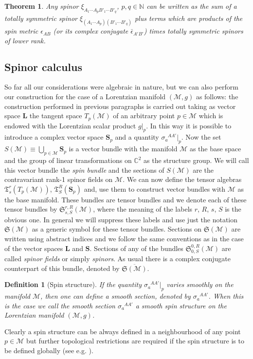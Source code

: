 \documentclass[final,3p,times,twocolumn]{elsarticle}
\newtheorem{theorem}{Theorem}
\newtheorem{definition}{Definition}
\begin{document}
\begin{theorem}
 Any spinor $\xi_{A_1\cdots A_p B'_1\cdots B'_q}$, $p,q\in\mathbb{N}$ can be written as the sum
of a totally symmetric spinor $\xi_{(A_1\cdots A_p) (B'_1\cdots B'_q)}$ plus terms which are 
products of the spin metric $\epsilon_{AB}$ (or its complex conjugate $\bar\epsilon_{A'B'}$) 
times totally symmetric spinors of lower rank.
\label{theo:irr-decomp}
\end{theorem}


\subsection{Spinor calculus}
\label{subsec:spinor-calculus}
So far all our considerations were algebraic in nature, but we can also perform our construction for the case of a Lorentzian manifold $(\mathcal{M}, g)$ as follows: the construction performed in previous paragraphs is carried out taking as vector space ${\mathbf L}$ the tangent space $T_p(\mathcal{M})$ of an arbitrary point $p\in\mathcal{M}$ which is endowed with the Lorentzian scalar product $g|_p$. In this way it is possible to introduce a complex vector space $\mathbf{S}_p$ and a quantity $\sigma_a^{\phantom{a}AA'}|_p$. Now the set 
$S(\mathcal{M})\equiv\bigcup_{p\in{\mathcal M}} {\mathbf S}_p$ is a vector bundle with the manifold $\mathcal{M}$ as the base space and the group
of linear transformations on $\mathbb C^2$ as the structure group. We will call this vector bundle the {\em spin bundle} and the sections of $S(\mathcal{M})$ are the contravariant rank-1 spinor fields on ${\mathcal M}$.
We can now define the tensor algebras $\mathfrak{T}^r_s(T_p({\mathcal M}))$, 
$\mathfrak{T}^R_S(\mathbf S_p)$ and, 
use them to construct vector bundles with $\mathcal M$ as the base manifold. 
These bundles are tensor bundles and we denote each of these tensor bundles by 
$\mathfrak{S}^{r,R}_{s,S}(\mathcal M)$, where the meaning of the labels $r$, $R$, $s$, $S$ is the obvious one.  In general we will suppress these labels and use just the notation 
$\mathfrak{S}(\mathcal M)$ as a generic symbol for these tensor bundles. Sections on $\mathfrak{S}(\mathcal M)$ are written using abstract indices and we follow the same conventions as in the case of the vector spaces ${\mathbf L}$ and 
${\mathbf S}$. Sections of any of the bundles $\mathfrak{S}^{0,R}_{0,S}(\mathcal M)$
are called {\em spinor fields} or simply {\em spinors}. As usual there is a complex conjugate counterpart of this bundle, denoted by $\overline{\mathfrak{S}(\mathcal M)}$.
\begin{definition}[Spin structure]
If the quantity  $\sigma_{a}^{\phantom{a}AA'}|_p$ varies smoothly on the manifold $\mathcal M$, then one can define a smooth section, denoted by $\sigma_{a}^{\phantom{a}AA'}$. 
When this is the case we call the smooth section $\sigma_{a}^{\phantom{a}AA'}$
a smooth spin structure on the Lorentzian manifold $({\mathcal M},g)$. 
\end{definition}
Clearly a spin structure can be always defined in a neighbourhood of any point $p\in\mathcal{M}$ but further topological restrictions are required if the spin structure is to be defined globally (see e.g. \cite{NAKAHARA}). 
\end{document}

